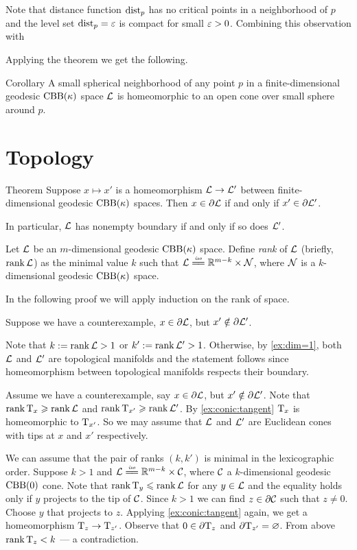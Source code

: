 Note that distance function $\mathrm{dist}_p$ has no critical points in a neighborhood of $p$ and the level set $\mathrm{dist}_p=\varepsilon$ is compact for small $\varepsilon>0$.
Combining this observation with 

Applying the theorem we get the following.

\begin{thm}{Corollary}
A small spherical neighborhood of any point $p$ in a finite-dimensional geodesic $\mathrm{CBB}(\kappa)$ space $\mathcal{L}$ is homeomorphic to an open cone over small sphere around $p$.
\end{thm}


\section{Topology}

\begin{thm}{Theorem}
Suppose $x\mapsto x'$ is a homeomorphism $\mathcal{L}\to\mathcal{L}'$ between finite-dimensional geodesic $\mathrm{CBB}(\kappa)$ spaces.
Then $x\in \partial \mathcal{L}$ if and only if $x'\in \partial \mathcal{L}'$.

In particular, $\mathcal{L}$ has nonempty boundary if and only if so does $\mathcal{L}'$.
\end{thm}

Let $\mathcal{L}$ be an $m$-dimensional geodesic $\mathrm{CBB}(\kappa)$ space.
Define \emph{rank} of $\mathcal{L}$ (briefly, $\operatorname{\rm rank}\nolimits\mathcal{L}$) as the minimal value $k$ such that $\spc{L}\iso\RR^{m-k}\times \spc{N}$,
where $\mathcal{N}$ is a $k$-dimensional geodesic $\mathrm{CBB}(\kappa)$ space.

In the following proof we will apply induction on the rank of space.

Suppose we have a counterexample, $x\in \partial \mathcal{L}$, but $x'\notin \partial \mathcal{L}'$.

Note that $k\mathrel{:=}\operatorname{\rm rank}\nolimits \mathcal{L}>1$ or $k'\mathrel{:=}\operatorname{\rm rank}\nolimits \mathcal{L}'>1$.
Otherwise, by \ref{ex:dim=1}, both $\mathcal{L}$ and $\mathcal{L}'$ are topological manifolds
and the statement follows since homeomorphism between topological manifolds respects their boundary.

Assume we have a counterexample, say $x\in \partial \mathcal{L}$, but $x'\notin \partial \mathcal{L}'$.
Note that $\operatorname{\rm rank}\nolimits \mathrm{T}_x\geqslant \operatorname{\rm rank}\nolimits \mathcal{L}$ and $\operatorname{\rm rank}\nolimits \mathrm{T}_{x'}\geqslant \operatorname{\rm rank}\nolimits \mathcal{L}'$.
By \ref{ex:conic:tangent} $\mathrm{T}_x$ is homeomorphic to $\mathrm{T}_{x'}$.
So we may assume that $\mathcal{L}$ and $\mathcal{L}'$ are Euclidean cones with tips at $x$ and $x'$ respectively.

We can assume that the pair of ranks $(k,k')$ is minimal in the lexicographic order.
Suppose $k>1$ and $\spc{L}\iso \RR^{m-k}\times \spc{C}$, where $\mathcal{C}$ a $k$-dimensional geodesic $\mathrm{CBB}(0)$ cone.
Note that $\operatorname{\rm rank}\nolimits\mathrm{T}_y\leqslant\operatorname{\rm rank}\nolimits\mathcal{L}$ for any $y\in\mathcal{L}$ and the equality holds only if $y$ projects to the tip of $\mathcal{C}$.
Since $k>1$ we can find $z\in\partial\mathcal{C}$ such that $z\ne 0$.
Choose $y$ that projects to $z$.
Applying \ref{ex:conic:tangent} again, we get a homeomorphism $\mathrm{T}_z\to \mathrm{T}_{z'}$.
Observe that $0\in\partial  \mathrm{T}_z$ and $\partial \mathrm{T}_{z'}=\varnothing$.
From above $\operatorname{\rm rank}\nolimits \mathrm{T}_z<k$ --- a contradiction.

